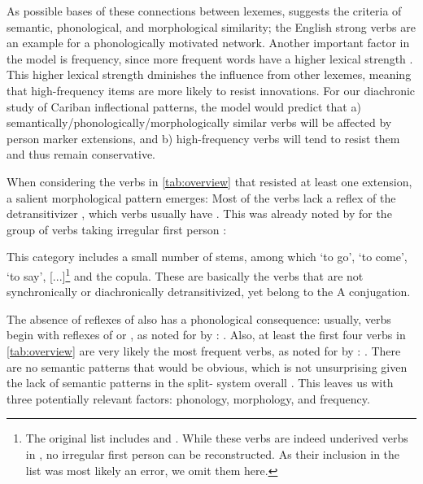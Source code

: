 As possible bases of these connections between lexemes, \textcite[118]{bybee1985morphology} suggests the criteria of semantic, phonological, and morphological similarity; the English strong verbs are an example for a phonologically motivated network.
Another important factor in the model is frequency, since more frequent words have a higher lexical strength \parencite[119]{bybee1985morphology}.
This higher lexical strength dminishes the influence from other lexemes, meaning that high-frequency items are more likely to resist innovations.
For our diachronic study of Cariban inflectional patterns, the model would predict that a) semantically\slash{}phonologically\slash\hspace{0pt}morphologically similar verbs will be affected by person marker extensions, and b) high-frequency verbs will tend to resist them and thus remain conservative.

When considering the verbs in \cref{tab:overview} that resisted at least one extension, a salient morphological pattern emerges:
Most of the verbs lack a reflex of the detransitivizer \detrz, which   verbs usually have .
This was already noted by \textcite{meira1998proto} for the group of \PTar verbs taking irregular first person :
\begin{quotebox}{\parencite[112]{meira1998proto}}
	This category includes a small number of stems, among which ‘to go’, ‘to come’, ‘to say’, [...]\footnote{The original list includes  and . While these verbs are indeed underived  verbs in \trio, no irregular first person  can be reconstructed. As their inclusion in the list was most likely an error, we omit them here.} and the copula. These are basically the verbs that are not synchronically or diachronically detransitivized, yet belong to the A conjugation.
\end{quotebox} %
%
The absence of reflexes of \detrz also has a phonological consequence: usually,  verbs begin with reflexes of  or , as noted for \arara by \textcite[153]{alves2017arara}: .
Also, at least the first four verbs in \cref{tab:overview} are very likely the most frequent  verbs, as noted for \kalina by \textcite[75]{courtz2008carib}: .
%
There are no semantic patterns that would be obvious, which is not unsurprising given the lack of semantic patterns in the split- system overall .
This leaves us with three potentially relevant factors: phonology, morphology, and frequency.

